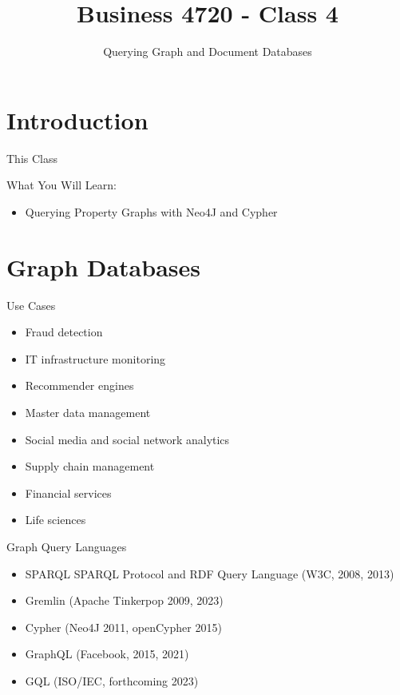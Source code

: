 \documentclass[ignorenonframetext,xcolor=x11names]{beamer}
\title{Business 4720 - Class 4}
\subtitle{Querying Graph and Document Databases}
\begin{document}
\begin{frame}{}
  \titlepage
  \footnotesize
  
\end{frame}

\section{Introduction}

\begin{frame}{This Class}

\begin{block}{What You Will Learn:}
\begin{itemize}
  \item Querying Property Graphs with Neo4J and Cypher
\end{itemize}
\end{block}
\end{frame}

\section{Graph Databases}

\begin{frame}{Use Cases}
\begin{itemize}
  \item Fraud detection
  \item IT infrastructure monitoring
  \item Recommender engines
  \item Master data management
  \item Social media and social network analytics
  \item Supply chain management
  \item Financial services
  \item Life sciences
\end{itemize}
\end{frame}


\begin{frame}{Graph Query Languages}

\begin{itemize}
  \item SPARQL SPARQL Protocol and RDF Query Language (W3C, 2008, 2013)
  \item Gremlin (Apache Tinkerpop 2009, 2023)
  \item Cypher (Neo4J 2011, openCypher 2015)
  \item GraphQL (Facebook, 2015, 2021)
  \item GQL (ISO/IEC, forthcoming 2023)
\end{itemize}

\end{frame}
\end{document}
